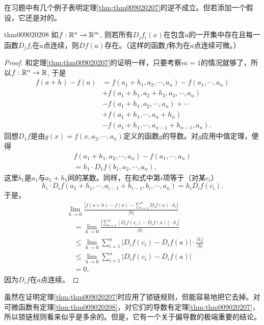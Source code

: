 在习题中有几个例子表明定理\ref{thm:thm009020207}的逆不成立。但若添加一个假设，它还是对的。

\begin{theorem}{}{thm009020208}
如$f:\mathbb{R}^n \to \mathbb{R}^m$, 则若所有$D_jf_i(x)$在包含$a$的一开集中存在且每一函数$D_jf_i$在$a$点连续，则$Df(a)$存在。（这样的函数$f$称为在$a$点连续可微。）
\end{theorem}

\begin{proof}
和定理\ref{thm:thm009020207}的证明一样，只要考察$m=1$的情况就够了，所以$f:\mathbb{R}^n \to \mathbb{R}$, 于是
\[
\begin{aligned}
f(a+h) - f(a) &= f(a_1 + h_1, a_2, \cdots, a_n) - f(a_1, \cdots, a_n)\\
&+ f(a_1+h_1,a_2+h_2,a_3,\cdots,a_n)\\
&- f(a_1+h_1,a_2,\cdots, a_n) + \cdots\\
&+ f(a_1+h_1,\cdots, a_n+h_n) \\
&- f(a_1+h_1, \cdots, a_{n-1} + h_{n-1}, a_n).
\end{aligned}
\]
回想$D_1f$是由$g(x) = f(x, a_2, \cdots, a_n)$定义的函数$g$的导数。对$g$应用中值定理，便得
\begin{gather*}
f(a_1+h_1, a_2, \cdots, a_n) - f(a_1, \cdots, a_n) \\
= h_1 \cdot D_1f(b_1, a_2, \cdots, a_n),
\end{gather*}
这里$b_1$是$a_1$与$a_1+h_1$间的某数。同样，在和式中第$i$项等于（对某$c_i$）
\[
h_i \cdot D_if(a_1+h_1, \cdots, a_{i-1}+h_{i-1}, b_i, \cdots, a_n) = h_iD_if(c_i).
\]
于是，
\begin{align*}
&\lim_{h \to 0}{\frac{\left|f(a+h) - f(a) - \sum\limits_{i=1}^{n}{D_if(a) \cdot h_i}\right|}{|h|}}\\
&\quad = \lim_{h \to 0}{\frac{\left|\sum\limits_{i=1}^{n}{[D_if(c_i) - D_if(a)] \cdot h_i}\right|}{|h|}}\\
&\quad \le\lim_{h \to 0}{\sum_{i=1}^{n}{|D_if(c_i) - D_if(a)| \cdot \frac{|h_i|}{|h|}}}\\
&\quad \le\lim_{h \to 0}{\sum_{i=1}^{n}{|D_if(c_i) - D_if(a)|}}\\
&\quad = 0,
\end{align*}
因为$D_if$在$a$点连续。
\end{proof}

虽然在证明定理\ref{thm:thm009020207}时应用了锁链规则，但能容易地把它去掉。对可微函数有定理\ref{thm:thm009020208}，对它们的导数有定理\ref{thm:thm009020207}，所以锁链规则看来似乎是多余的。但是，它有一个关于偏导数的极端重要的结论。

